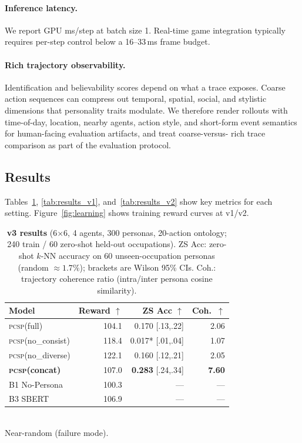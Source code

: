 \documentclass[conference]{IEEEtran}
\newcommand{\PCSP}{\textsc{pcsp}\xspace}
\begin{document}
\paragraph{Inference latency.}
We report GPU ms/step at batch size 1. Real-time game integration typically
requires per-step control below a 16--33\,ms frame budget.

\paragraph{Rich trajectory observability.}
Identification and believability scores depend on what a trace exposes.
Coarse action sequences can compress out temporal, spatial, social, and
stylistic dimensions that personality traits modulate. We therefore render
rollouts with time-of-day, location, nearby agents, action style, and short-form
event semantics for human-facing evaluation artifacts, and treat coarse-versus-
rich trace comparison as part of the evaluation protocol.

\subsection{Results}

Tables~\ref{tab:results_v3}, \ref{tab:results_v1}, and~\ref{tab:results_v2}
show key metrics for each setting. Figure~\ref{fig:learning} shows training
reward curves at v1/v2.

\begin{table}[t]
  \centering
  \small
  \caption{%
    \textbf{v3 results} (6$\times$6, 4 agents, 300 personas, 20-action
    ontology; 240 train / 60 zero-shot held-out occupations).
    ZS Acc: zero-shot $k$-NN accuracy on 60 unseen-occupation personas
    (random $\approx\!1.7\%$); brackets are Wilson 95\% CIs.
    Coh.: trajectory coherence ratio (intra/inter persona cosine similarity).}
  \label{tab:results_v3}
  \setlength{\tabcolsep}{3pt}
  \begin{tabular}{lrrr}
    \toprule
    Model & Reward $\uparrow$ & ZS Acc $\uparrow$ & Coh.\ $\uparrow$ \\
    \midrule
    \PCSP (full)                 & 104.1 & 0.170 \scriptsize{[.13,.22]}              & 2.06 \\
    \PCSP (no\_consist)          & 118.4 & 0.017* \scriptsize{[.01,.04]}             & 1.07 \\
    \PCSP (no\_diverse)          & 122.1 & 0.160 \scriptsize{[.12,.21]}              & 2.05 \\
    \textbf{\PCSP (concat)}      & 107.0 & \textbf{0.283} \scriptsize{[.24,.34]}     & \textbf{7.60} \\
    B1 No-Persona                & 100.3 & ---                                        & --- \\
    B3 SBERT                     & 106.9 & ---                                        & --- \\
    \bottomrule
  \end{tabular}\\[2pt]
  {\footnotesize * Near-random (failure mode).}
\end{table}
\end{document}

